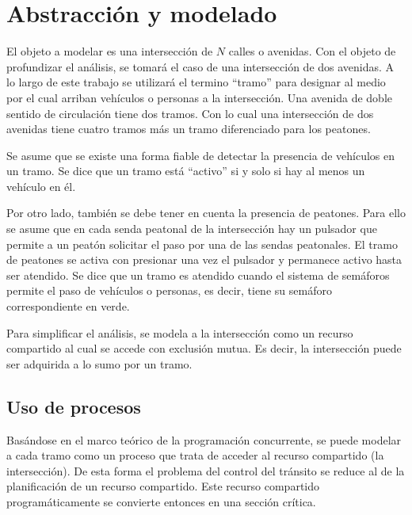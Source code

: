 \section{Abstracción y modelado}
El objeto a modelar es una intersección de $N$ calles o avenidas. Con el objeto de profundizar el análisis, se tomará el caso de una intersección de dos avenidas. A lo largo de este trabajo se utilizará el termino \enquote{tramo} para designar al medio por el cual arriban vehículos o personas a la intersección. Una avenida de doble sentido de circulación tiene dos tramos. Con lo cual una intersección de dos avenidas tiene cuatro tramos más un tramo diferenciado para los peatones.

Se asume que se existe una forma fiable de detectar la presencia de vehículos en un tramo. Se dice que un tramo está \enquote{activo} si y solo si hay al menos un vehículo en él.

Por otro lado, también se debe tener en cuenta la presencia de peatones. Para ello se asume que en cada senda peatonal de la intersección hay un pulsador que permite a un peatón solicitar el paso por una de las sendas peatonales. El tramo de peatones se activa con presionar una vez el pulsador y permanece activo hasta ser atendido. Se dice que un tramo es atendido cuando el sistema de semáforos permite el paso de vehículos o personas, es decir, tiene su semáforo correspondiente en verde.

Para simplificar el análisis, se modela a la intersección como un recurso compartido al cual se accede con exclusión mutua. Es decir, la intersección puede ser adquirida a lo sumo por un tramo.

\subsection{Uso de procesos}
Basándose en el marco teórico de la programación concurrente, se puede modelar a cada tramo como un proceso que trata de acceder al recurso compartido (la intersección). De esta forma el problema del control del tránsito se reduce al de la planificación de un recurso compartido. Este recurso compartido programáticamente se convierte entonces en una sección crítica.

